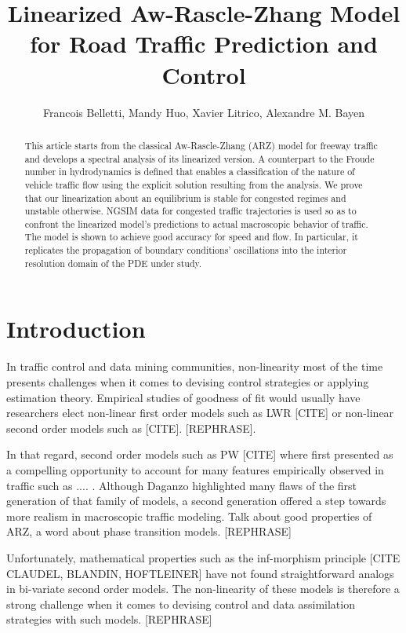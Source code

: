 \documentclass[a4paper, 10pt, conference]{ieeeconf}      %
\title{\LARGE \bf
Linearized Aw-Rascle-Zhang Model for Road Traffic Prediction and Control
}
\author{Francois Belletti, Mandy Huo, Xavier Litrico, Alexandre M. Bayen}
\begin{document}
\maketitle
\thispagestyle{empty}
\pagestyle{empty}

\begin{abstract}
This article starts from the classical Aw-Rascle-Zhang (ARZ) model for freeway traffic and develops a spectral analysis of its linearized version. A counterpart to the Froude number in hydrodynamics is defined that enables a classification of the nature of vehicle traffic flow using the explicit solution resulting from the analysis. We prove that our linearization about an equilibrium is stable for congested regimes and unstable otherwise. NGSIM data for congested traffic trajectories is used so as to confront the linearized model's predictions to actual macroscopic behavior of traffic. The model is shown to achieve good accuracy for speed and flow. In particular, it replicates the propagation of boundary conditions' oscillations into the interior resolution domain of the PDE under study.
\end{abstract}


\section{Introduction}

In traffic control and data mining communities, non-linearity most of the time presents challenges when it comes to devising control strategies or applying estimation theory. Empirical studies of goodness of fit would usually have researchers elect non-linear first order models such as LWR [CITE] or non-linear second order models such as [CITE]. [REPHRASE].

In that regard, second order models such as PW [CITE] where first presented as a compelling opportunity to account for many features empirically observed in traffic such as .... . Although Daganzo highlighted many flaws of the first generation of that family of models, a second generation offered a step towards more realism in macroscopic traffic modeling. Talk about good properties of ARZ, a word about phase transition models. [REPHRASE]

Unfortunately, mathematical properties such as the inf-morphism principle [CITE CLAUDEL, BLANDIN, HOFTLEINER] have not found straightforward analogs in bi-variate second order models. The non-linearity of these models is therefore a strong challenge when it comes to devising control and data assimilation strategies with such models. [REPHRASE]
\end{document}
